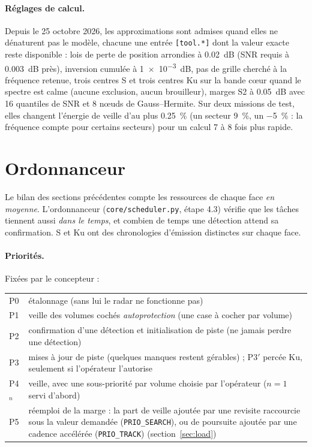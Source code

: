 \documentclass[11pt,a4paper]{article}
\newcommand{\code}[1]{\texttt{\small #1}}
\begin{document}
\paragraph{Réglages de calcul.} Depuis le 25 octobre 2026, les approximations sont admises quand elles ne dénaturent
pas le modèle, chacune une entrée \code{[tool.*]} dont la valeur exacte reste disponible : lois de perte de position
arrondies à \SI{0.02}{dB} (SNR requis à \SI{0.003}{dB} près), inversion cumulée à \SI{1e-3}{dB}, pas de grille cherché
à la fréquence retenue, trois centres S et trois centres Ku sur la bande c\oe{}ur quand le spectre est calme (aucune
exclusion, aucun brouilleur), marges S2 à \SI{0.05}{dB} avec 16 quantiles de SNR et 8 n\oe{}uds de Gauss--Hermite. Sur deux
missions de test, elles changent l'énergie de veille d'au plus \SI{+0.25}{\percent} (un secteur \SI{+9}{\percent}, un
\SI{-5}{\percent} : la fréquence compte pour certains secteurs) pour un calcul 7 à 8 fois plus rapide.

\section{Ordonnanceur}\label{sec:sched}
Le bilan des sections précédentes compte les ressources de chaque face \emph{en moyenne}. L'ordonnanceur
(\code{core/scheduler.py}, étape 4.3) vérifie que les tâches tiennent aussi \emph{dans le temps}, et combien de temps
une détection attend sa confirmation. S et Ku ont des chronologies d'émission distinctes sur chaque face.

\paragraph{Priorités.} Fixées par le concepteur :
\begin{center}
\begin{tabularx}{\linewidth}{@{}lL@{}}
\toprule
P0 & étalonnage (sans lui le radar ne fonctionne pas)\\
P1 & veille des volumes cochés \emph{autoprotection} (une case à cocher par volume)\\
P2 & confirmation d'une détection et initialisation de piste (ne jamais perdre une détection)\\
P3 & mises à jour de piste (quelques manques restent gérables) ; P3$'$ percée Ku, seulement si l'opérateur l'autorise\\
P4$_n$ & veille, avec une sous-priorité par volume choisie par l'opérateur ($n = 1$ servi d'abord)\\
P5 & réemploi de la marge : la part de veille ajoutée par une revisite raccourcie sous la valeur demandée
(\code{PRIO\_SEARCH}), ou de poursuite ajoutée par une cadence accélérée (\code{PRIO\_TRACK}) (section~\ref{sec:load})\\
\bottomrule
\end{tabularx}
\end{center}
\end{document}
